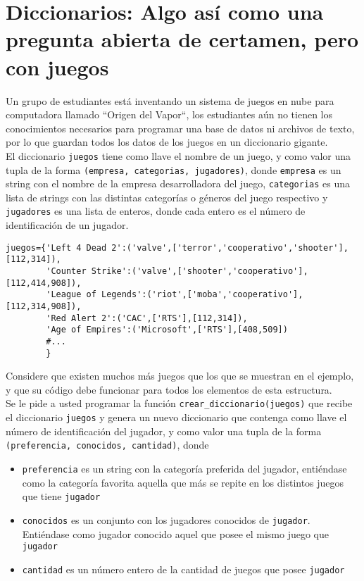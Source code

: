 \section{Diccionarios: Algo así como una pregunta abierta de certamen, pero con juegos}

Un grupo de estudiantes está inventando un sistema de juegos en nube para computadora llamado ``Origen del Vapor``, los estudiantes aún no tienen los conocimientos necesarios para programar una base de datos ni archivos de texto, por lo que guardan todos los datos de los juegos en un diccionario gigante.
\\
El diccionario \texttt{juegos} tiene como llave el nombre de un juego, y como valor una tupla de la forma \texttt{(empresa, categorias, jugadores)}, donde \texttt{empresa} es un string con el nombre de la empresa desarrolladora del juego, \texttt{categorias} es una lista de strings con las distintas categorías o géneros del juego respectivo y \texttt{jugadores} es una lista de enteros, donde cada entero es el número de identificación de un jugador.

\begin{lstlisting}[style=consola]
juegos={'Left 4 Dead 2':('valve',['terror','cooperativo','shooter'],[112,314]),
        'Counter Strike':('valve',['shooter','cooperativo'],[112,414,908]),
        'League of Legends':('riot',['moba','cooperativo'],[112,314,908]),
        'Red Alert 2':('CAC',['RTS'],[112,314]),
        'Age of Empires':('Microsoft',['RTS'],[408,509])
        #...
        }
\end{lstlisting}

Considere que existen muchos más juegos que los que se muestran en el ejemplo, y que su código debe funcionar para todos los elementos de esta estructura.
\\
Se le pide a usted programar la función \texttt{crear\_diccionario(juegos)} que recibe el diccionario \texttt{juegos} y genera un nuevo diccionario que contenga como llave el número de identificación del jugador, y como valor una tupla de la forma \texttt{(preferencia, conocidos, cantidad)}, donde 
\begin{itemize}
    \item \texttt{preferencia} es un string con la categoría preferida del jugador, entiéndase como la categoría favorita aquella que más se repite en los distintos juegos que tiene \texttt{jugador}
    \item \texttt{conocidos} es un conjunto con los jugadores conocidos de \texttt{jugador}. Entiéndase como jugador conocido aquel que posee el mismo juego que \texttt{jugador}
    \item \texttt{cantidad} es un número entero de la cantidad de juegos que posee \texttt{jugador}
\end{itemize}

